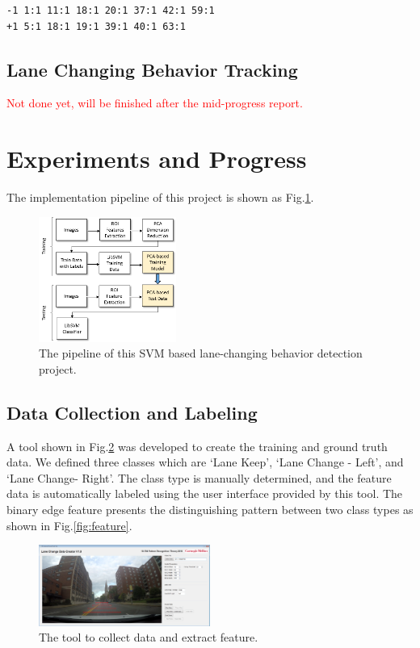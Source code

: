 \documentclass[10pt,twocolumn,letterpaper]{article}
\begin{document}
\begin{verbatim}
-1 1:1 11:1 18:1 20:1 37:1 42:1 59:1 
+1 5:1 18:1 19:1 39:1 40:1 63:1 
\end{verbatim}

\subsection{Lane Changing Behavior Tracking}

\textcolor{red}{Not done yet, will be finished after the mid-progress report.}

\section{Experiments and Progress}

The implementation pipeline of this project is shown as Fig.\ref{fig:pipeline}.

\begin{figure}[t]
	\centering
	\includegraphics[width=0.4\textwidth]{./img/pipeline.png}
	\caption{The pipeline of this SVM based lane-changing behavior detection project.}
	\label{fig:pipeline}
\end{figure}

\subsection{Data Collection and Labeling}

A tool shown in Fig.\ref{fig:tool} was developed to create the training and ground truth data. We defined three classes which are `Lane Keep', `Lane Change - Left', and `Lane Change- Right'. The class type is manually determined, and the feature data is automatically labeled using the user interface provided by this tool. The binary edge feature presents the distinguishing pattern between two class types as shown in Fig.\ref{fig:feature}.

\begin{figure}[t]
	\centering
	\includegraphics[width=0.5\textwidth]{./img/tool.png}
	\caption{The tool to collect data and extract feature.}
	\label{fig:tool}
\end{figure}
\end{document}

